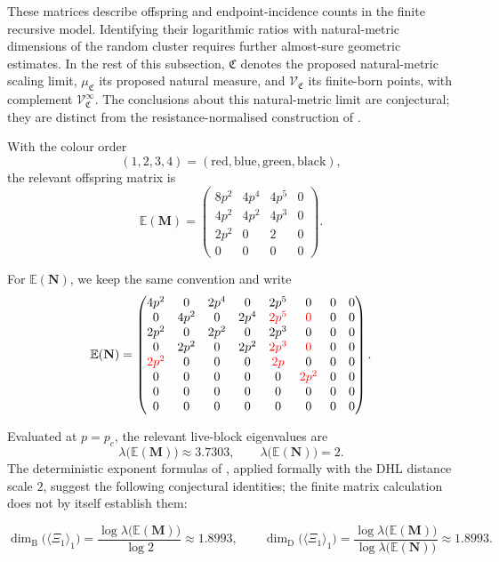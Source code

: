 \documentclass{article}
\DeclareRobustCommand{\revision}[1]{{\color{red}#1}}
\theoremstyle{plain}
\theoremstyle{definition}
\newcommand{\dimbox}{\dim_\mathrm{B}}
\newcommand{\dimdeg}{\dim_\mathrm{D}}
\begin{document}
These matrices describe offspring and endpoint-incidence counts in the
finite recursive model. Identifying their logarithmic ratios with
natural-metric dimensions of the random cluster requires further
almost-sure geometric estimates. In the rest of this subsection,
$\mathfrak C$ denotes the proposed natural-metric scaling limit,
$\mu_{\mathfrak C}$ its proposed natural measure, and
$\mathscr V_{\mathfrak C}$ its finite-born points, with complement
$\mathscr V_{\mathfrak C}^{\infty}$.
The conclusions about this natural-metric limit are conjectural; they
are distinct from the resistance-normalised construction of
\cite{hambly2010diffusion}.
\endgroup{}

With the colour order
\[
(1,2,3,4)=(\mathrm{red},\mathrm{blue},\mathrm{green},\mathrm{black}),
\]
the relevant offspring matrix is
\[
\mathbb E(\mathbf M)
=
\begin{pmatrix}
8p^2 & 4p^4 & 4p^5 & 0\\
4p^2 & 4p^2 & 4p^3 & 0\\
2p^2 & 0 & 2 & 0\\
0 & 0 & 0 & 0
\end{pmatrix}.
\]

For $\mathbb E(\mathbf N)$, we keep the same convention and write
\[
\mathbb E(\mathbf N)
=
\begin{pmatrix}
4p^2&0&2p^4&0&2p^5&0&0&0\\
0&4p^2&0&2p^4&\revision{2p^5}&\revision{0}&0&0\\
2p^2&0&2p^2&0&2p^3&0&0&0\\
0&2p^2&0&2p^2&\revision{2p^3}&\revision{0}&0&0\\
\revision{2p^2}&0&0&0&\revision{2p}&0&0&0\\
0&0&0&0&0&\revision{2p^2}&0&0\\
0&0&0&0&0&0&0&0\\
0&0&0&0&0&0&0&0
\end{pmatrix}.
\]

Evaluated at $p=p_c$, the relevant live-block eigenvalues are
\[
\lambda\bigl(\mathbb E(\mathbf M)\bigr)\approx 3.7303,
\qquad
\lambda\bigl(\mathbb E(\mathbf N)\bigr)=2.
\]
\begingroup\color{red}
The deterministic exponent formulas of
\cite{li2024on,neroli2024fractal,li2025reducible}, applied formally with
the DHL distance scale $2$, suggest the following conjectural identities;
the finite matrix calculation does not by itself establish them:
\endgroup{}

\[
\dimbox\big(\langle \Xi_1\rangle_1\big)
=
\frac{\log \lambda\bigl(\mathbb E(\mathbf M)\bigr)}{\log 2}
\approx 1.8993,
\qquad
\dimdeg\big(\langle \Xi_1\rangle_1\big)
=
\frac{\log \lambda\bigl(\mathbb E(\mathbf M)\bigr)}{\log \lambda\bigl(\mathbb E(\mathbf N)\bigr)}
\approx 1.8993.
\]
\end{document}
